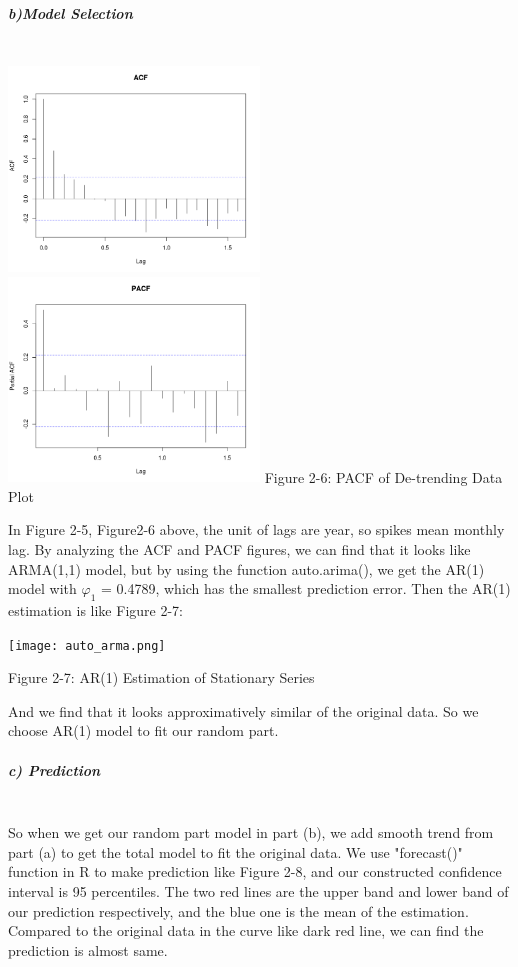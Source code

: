 \documentclass[11pt,a4paper]{article}
\begin{document}
\begin{itemize}
\subparagraph{b)Model Selection}\mbox{}\\
\includegraphics[width=0.5\textwidth]{ACF.png}
\includegraphics[width=0.5\textwidth]{PACF.png}
\hspace{3cm}{Figure 2-5: ACF of De-trending Data Plot}\hspace{2cm} {Figure 2-6: PACF of De-trending Data Plot}

In Figure 2-5, Figure2-6  above, the unit of lags are year, so spikes mean monthly lag. 
By analyzing the ACF and PACF figures, we can find that it looks like ARMA(1,1) model, but by using the function auto.arima(), we get the AR(1) model with $\varphi_1$ = 0.4789, which has the smallest prediction error. Then the AR(1) estimation is like Figure 2-7:

\end{itemize}


\begin{center}
\texttt{[image: auto\_arma.png]}
\end{center}
\begin{center}
{Figure 2-7: AR(1) Estimation of Stationary Series}
\end{center}
And we find that it looks approximatively similar of the original  data. So we choose AR(1) model to fit our random part.
\subparagraph{c) Prediction}\mbox{}\\ 

So when we get our random part model in part (b), we add smooth trend from part (a) to get the total model to fit the original data. We use "forecast()" function in R to make prediction like Figure 2-8, and our constructed confidence interval is 95 percentiles. 
The two red lines are the upper band and lower band of our prediction respectively, and the blue one is the mean of the estimation. Compared to the original data in the curve like dark red line, we can find the prediction is almost same.
\end{document}
